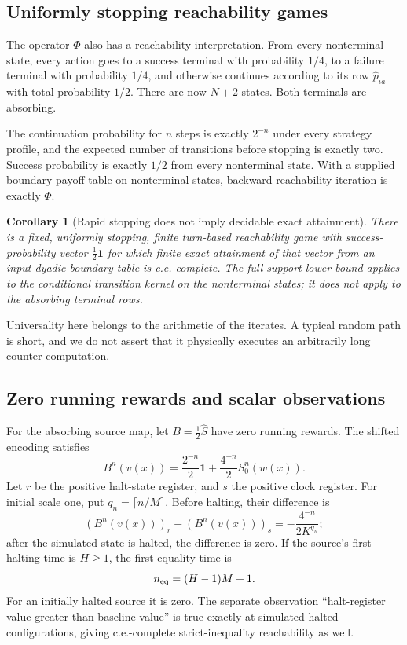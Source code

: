 \documentclass[11pt,letterpaper]{article}
\newtheorem{corollary}[theorem]{Corollary}
\theoremstyle{definition}
\theoremstyle{remark}
\newcommand{\one}{\mathbf 1}
\begin{document}
\subsection{Uniformly stopping reachability games}

The operator $\Phi$ also has a reachability interpretation. From every
nonterminal state, every action goes to a success terminal with probability
$1/4$, to a failure terminal with probability $1/4$, and otherwise continues
according to its row $\widehat p_{ia}$ with total probability $1/2$.
There are now $N+2$ states. Both terminals are absorbing.

The continuation probability for $n$ steps is exactly $2^{-n}$ under every
strategy profile, and the expected number of transitions before stopping
is exactly two. Success probability is exactly $1/2$ from every
nonterminal state. With a supplied boundary payoff table on nonterminal
states, backward reachability iteration is exactly $\Phi$.

\begin{corollary}[Rapid stopping does not imply decidable exact attainment]\label{ste:ec:cor:stopping}
There is a fixed, uniformly stopping, finite turn-based reachability game
with success-probability vector $\tfrac12\one$ for which finite exact
attainment of that vector from an input dyadic boundary table is
c.e.-complete. The full-support lower bound applies to the conditional
transition kernel on the nonterminal states; it does not apply to the
absorbing terminal rows.
\end{corollary}

Universality here belongs to the arithmetic of the iterates. A typical
random path is short, and we do not assert that it physically executes
an arbitrarily long counter computation.

\subsection{Zero running rewards and scalar observations}

For the absorbing source map, let $B=\tfrac12\widehat S$ have zero
running rewards. The shifted encoding satisfies
\begin{equation}
 B^n(v(x))=\frac{2^{-n}}2\one+\frac{4^{-n}}2S_0^n(w(x)).
 \label{ste:ec:eq:zero-reward-shift}
\end{equation}
Let $r$ be the positive halt-state register, and $s$ the positive clock
register. For initial scale one, put $q_n=\lceil n/M\rceil$. Before
halting, their difference is
\begin{equation}
 (B^n(v(x)))_r-(B^n(v(x)))_s
       =-\frac{4^{-n}}{2K^{q_n}};
 \label{ste:ec:eq:exact-gap}
\end{equation}
after the simulated state is halted, the difference is zero.
If the source's first halting time is $H\geq1$, the first equality time is
\begin{equation}
 n_{\rm eq}=(H-1)M+1.
 \label{ste:ec:eq:equality-time}
\end{equation}
For an initially halted source it is zero. The separate observation
``halt-register value greater than baseline value'' is true exactly at
simulated halted configurations, giving c.e.-complete strict-inequality
reachability as well.
\end{document}
